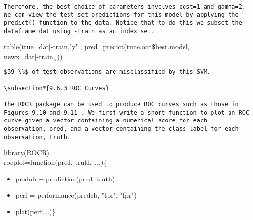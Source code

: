 \documentclass[10pt]{article}
\begin{document}
\begin{verbatim}

Therefore, the best choice of parameters involves cost=1 and gamma=2. We can view the test set predictions for this model by applying the predict() function to the data. Notice that to do this we subset the dataframe dat using -train as an index set.
\end{verbatim}

\begin{displayquote}
table(true=dat[-train,"y"], pred=predict(tune.out\$best.model,\\[0pt]
newx=dat[-train,]))
\end{displayquote}

\begin{verbatim}
$39 \%$ of test observations are misclassified by this SVM.

\subsection*{9.6.3 ROC Curves}

The ROCR package can be used to produce ROC curves such as those in Figures 9.10 and 9.11 . We first write a short function to plot an ROC curve given a vector containing a numerical score for each observation, pred, and a vector containing the class label for each observation, truth.
\end{verbatim}

\begin{displayquote}
library(ROCR)\\
rocplot=function(pred, truth, ...)\{
\end{displayquote}

\begin{itemize}
  \item predob = prediction(pred, truth)
  \item perf = performance(predob, "tpr", "fpr")
  \item plot(perf,...)\}
\end{itemize}
\end{document}
